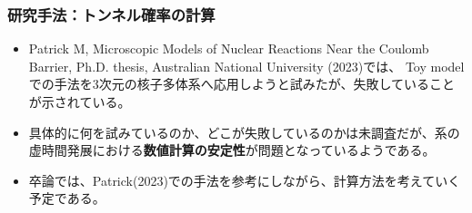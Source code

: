 \documentclass[11pt,aspectratio=169,xcolor=dvipsnames,table,dvipdfmx]{beamer}
\theoremstyle{definition}
\begin{document}
\begin{frame}
  \frametitle{研究手法：トンネル確率の計算}
  \begin{itemize}
    \item Patrick M, Microscopic Models of Nuclear Reactions Near the Coulomb Barrier, Ph.D. thesis, Australian National University (2023)では、
    Toy modelでの手法を3次元の核子多体系へ応用しようと試みたが、失敗していることが示されている。
    \item 具体的に何を試みているのか、どこが失敗しているのかは未調査だが、系の虚時間発展における\textbf{数値計算の安定性}が問題となっているようである。
    \item 卒論では、Patrick(2023)での手法を参考にしながら、計算方法を考えていく予定である。
  \end{itemize}
  
  

  

\end{frame}



\appendix
\end{document}
